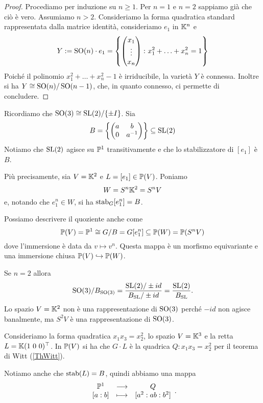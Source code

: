 \begin{proof}
Procediamo per induzione su $n\ge 1$. Per $n=1$ e $n=2$ sappiamo già che ciò è vero. Assumiamo $n>2$. Consideriamo la forma quadratica standard rappresentata dalla matrice identità, consideriamo $e_1$ in $\mathbb{K}^n$ e 
\[Y:= \operatorname{SO}(n)\cdot e_1=\left\{ \begin{pmatrix}
        x_1 \\ \vdots \\ x_n 
    \end{pmatrix} \colon x_1^2+\ldots+x_n^2=1\right\}\] 
Poiché il polinomio $x_1^2+\ldots+x_n^2-1$ è irriducibile, la varietà $Y$ è connessa. Inoltre si ha $Y\cong \operatorname{SO}(n)/\operatorname{SO}(n-1)$, che, in quanto connesso, ci permette di concludere.
\end{proof}

 





















Ricordiamo che $\operatorname{SO}(3)\cong \mathrm{SL}(2)/\{\pm I\}$.
Sia 
\[B=\left\{{\begin{pmatrix}a&b\\0&a^{-1}\end{pmatrix}}\right\}\subseteq \mathrm{SL}(2)\]
Notiamo che $\mathrm{SL}(2)$ agisce su $\mathbb{P}^1$ transitivamente e che lo stabilizzatore di $[e_1]$ \`e $B$.


Pi\`u precisamente, sia $V=\mathbb{K}^2$ e $L=[e_1]\in\mathbb{P}(V)$. Poniamo
\[W=S^n\mathbb{K}^2=S^nV\]
e, notando che $e_1^n\in W$, si ha $\operatorname{stab}_G[e_1^n]=B$.

Possiamo descrivere il quoziente anche come
\[\mathbb{P}(V)=\mathbb{P}^1\cong G/B=G[e_1^n]\subseteq \mathbb{P}(W)=\mathbb{P}(S^n V)\]
dove l'immersione \`e data da $v\mapsto v^n$. Questa mappa \`e un morfismo equivariante e una immersione chiusa $\mathbb{P}(V)\hookrightarrow \mathbb{P}(W)$.





\begin{remark}
Se $n=2$ allora
\[\operatorname{SO}(3)/B_{\operatorname{SO}(3)}=\frac{\mathrm{SL}(2)/\pm id}{B_{\mathrm{SL}}/\pm id}=\frac{\mathrm{SL}(2)}{B_{\mathrm{SL}}}.\]
Lo spazio $V=\mathbb{K}^2$ non \`e una rappresentazione di $\operatorname{SO}(3)$ perch\'e $-id$ non agisce banalmente, ma $S^2V$ \`e una rappresentazione di $\operatorname{SO}(3)$.
\end{remark}



\begin{example}
Consideriamo la forma quadratica $x_1x_3=x_2^2$, lo spazio $V=\mathbb{K}^3$ e la retta $L=\mathbb{K}(1\ 0\ 0)^\top$. In $\mathbb{P}(V)$ si ha che $G\cdot L$ \`e la quadrica $Q:x_1x_3=x_2^2$ per il teorema di Witt (\ref{ThWitt}).

Notiamo anche che $\operatorname{stab}(L)=B$, quindi abbiamo una mappa
\[\begin{array}{ccc} {\mathbb{P}^1} & \longrightarrow & {Q}\\ {[a:b]} & \longmapsto & {[a^2:ab:b^2]} \end{array}.\]
\end{example}







